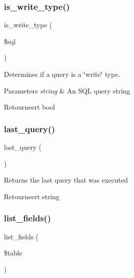 \subsubsection{\texorpdfstring{is\_write\_type()}{is\_write\_type()}}
{\footnotesize\ttfamily is\+\_\+write\+\_\+type (\begin{DoxyParamCaption}\item[{}]{\$sql }\end{DoxyParamCaption})}

Determines if a query is a \char`\"{}write\char`\"{} type.


\begin{DoxyParams}{Parameters}
{\em string} & An S\+QL query string \\
\hline
\end{DoxyParams}
\begin{DoxyReturn}{Retourneert}
bool 
\end{DoxyReturn}
\mbox{\label{class_c_i___d_b__driver_a8117354f1fa0b2873f0ad2792dc21389}} 
\subsubsection{\texorpdfstring{last\_query()}{last\_query()}}
{\footnotesize\ttfamily last\+\_\+query (\begin{DoxyParamCaption}{ }\end{DoxyParamCaption})}

Returns the last query that was executed

\begin{DoxyReturn}{Retourneert}
string 
\end{DoxyReturn}
\mbox{\label{class_c_i___d_b__driver_aef08cd376b16b24608100ca0e3f2f85b}} 
\subsubsection{\texorpdfstring{list\_fields()}{list\_fields()}}
{\footnotesize\ttfamily list\+\_\+fields (\begin{DoxyParamCaption}\item[{}]{\$table }\end{DoxyParamCaption})}


